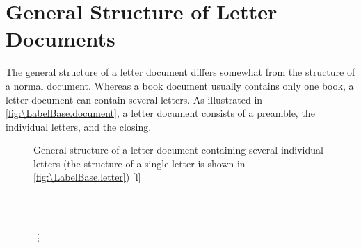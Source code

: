 \section{General Structure of Letter Documents}
\BeginIndexGroup
{}

The general structure of a letter document differs somewhat from the structure
of a normal document. Whereas a book document usually contains only one book,
a letter document can contain several letters. As illustrated in
\autoref{fig:\LabelBase.document}, a letter document consists of a preamble,
the individual letters, and the closing.

\begin{figure}
  \setcapindent{0pt}%
  \begin{captionbeside}{%
      General structure of a letter document containing several individual letters
      (the structure of a single letter is shown in
      \autoref{fig:\LabelBase.letter})%
      \label{fig:\LabelBase.document}%
    }[l]
    \begin{minipage}[b]{.667\linewidth}
      \centering\small\setlength{\fboxsep}{1.5ex}%
      \addtolength{\linewidth}{-\dimexpr2\fboxrule+2\fboxsep\relax}%
      \\
      \\[2pt]
      \parbox{\linewidth}{\raggedright\vspace{-.5ex}\vdots\vspace{1ex}}\\
      \\[\dimexpr\fboxsep+\fboxrule\relax]
    \end{minipage}
  \end{captionbeside}
\end{figure}

